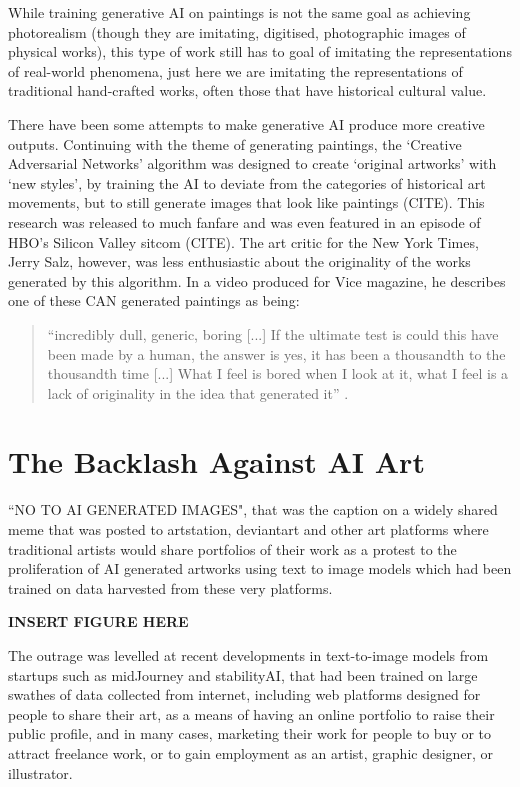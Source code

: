 While training generative AI on paintings is not the same goal as achieving photorealism (though they are imitating, digitised, photographic images of physical works), this type of work still has to goal of imitating the representations of real-world phenomena, just here we are imitating the representations of traditional hand-crafted works, often those that have historical cultural value.

There have been some attempts to make generative AI produce more creative outputs. 
Continuing with the theme of generating paintings, the ‘Creative Adversarial Networks’ algorithm was designed to create ‘original artworks’ with ‘new styles’, by training the AI to deviate from the categories of historical art movements, but to still generate images that look like paintings (CITE). 
This research was released to much fanfare and was even featured in an episode of HBO’s Silicon Valley sitcom (CITE). 
The art critic for the New York Times, Jerry Salz, however, was less enthusiastic about the originality of the works generated by this algorithm. 
In a video produced for Vice magazine, he describes one of these CAN generated paintings as being:
\begin{quote}“incredibly dull, generic, boring [...] If the ultimate test is could this have been made by a human, the answer is yes, it has been a thousandth to the thousandth time [...] What I feel is bored when I look at it, what I feel is a lack of originality in the idea that generated it” \citep{saltz2018aiart}. \end{quote}

\section{The Backlash Against AI Art}

``NO TO AI GENERATED IMAGES", that was the caption on a widely shared meme that was posted to artstation, deviantart and other art platforms where traditional artists would share portfolios of their work as a protest to the proliferation of AI generated artworks using text to image models which had been trained on data harvested from these very platforms. 

\textbf{INSERT FIGURE HERE}

The outrage was levelled at recent developments in text-to-image models from startups such as midJourney and stabilityAI, that had been trained on large swathes of data collected from internet, including web platforms designed for people to share their art, as a means of having an online portfolio to raise their public profile, and in many cases, marketing their work for people to buy or to attract freelance work, or to gain employment as an artist, graphic designer, or illustrator.

